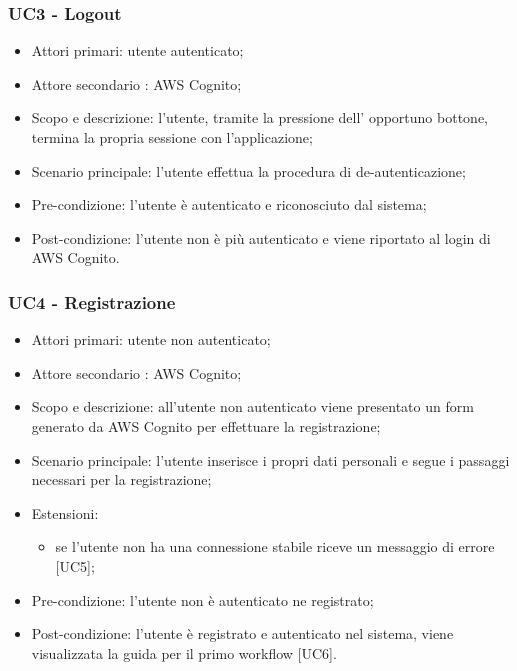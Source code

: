 \subsubsection{UC3 - Logout}
\begin{itemize}
	\item  Attori primari: utente autenticato;
    \item  Attore secondario : AWS Cognito;	
    \item  Scopo e descrizione: l'utente, tramite la pressione dell' opportuno bottone, termina la propria sessione con l'applicazione;
	\item  Scenario principale: l'utente effettua la procedura di de-autenticazione;
	\item  Pre-condizione: l'utente è autenticato e riconosciuto dal sistema;
	\item  Post-condizione: l'utente non è più autenticato e viene riportato al login di AWS Cognito.
\end{itemize}


\subsubsection{UC4 - Registrazione}
\begin{itemize}
	\item  Attori primari: utente non autenticato;
	\item  Attore secondario : AWS Cognito;
	\item  Scopo e descrizione: all'utente non autenticato viene presentato un form generato da AWS Cognito per effettuare la registrazione;
	\item  Scenario principale: l'utente inserisce i propri dati personali e segue i passaggi necessari per la registrazione;
	\item  Estensioni:
		   \begin{itemize}
		   	    \item se l'utente non ha una connessione stabile riceve un messaggio di errore [UC5];
		   \end{itemize}		    
	\item  Pre-condizione: l'utente non è autenticato ne registrato;
	\item  Post-condizione: l'utente è registrato e autenticato nel sistema, viene visualizzata la guida per il primo workflow [UC6].
\end{itemize}

